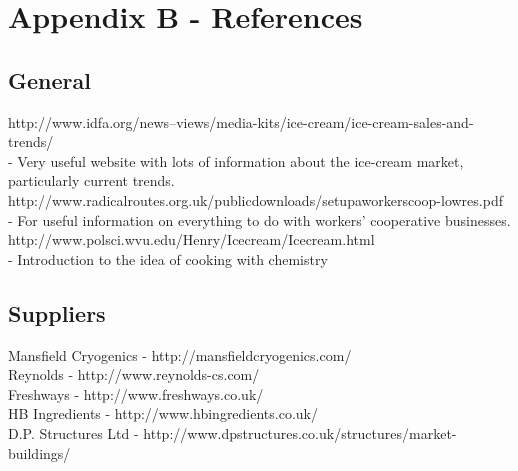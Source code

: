 \documentclass{article}
\begin{document}
\section{Appendix B - References}

\subsection{General}

http://www.idfa.org/news--views/media-kits/ice-cream/ice-cream-sales-and-trends/ \\
 - Very useful website with lots of information about the ice-cream market, particularly current trends. \\

http://www.radicalroutes.org.uk/publicdownloads/setupaworkerscoop-lowres.pdf \\
 - For useful information on everything to do with workers' cooperative businesses. \\

http://www.polsci.wvu.edu/Henry/Icecream/Icecream.html \\
 - Introduction to the idea of cooking with chemistry

\subsection{Suppliers}

Mansfield Cryogenics - http://mansfieldcryogenics.com/ \\

Reynolds - http://www.reynolds-cs.com/ \\

Freshways - http://www.freshways.co.uk/ \\

HB Ingredients - http://www.hbingredients.co.uk/ \\

D.P. Structures Ltd - http://www.dpstructures.co.uk/structures/market-buildings/
\end{document}
